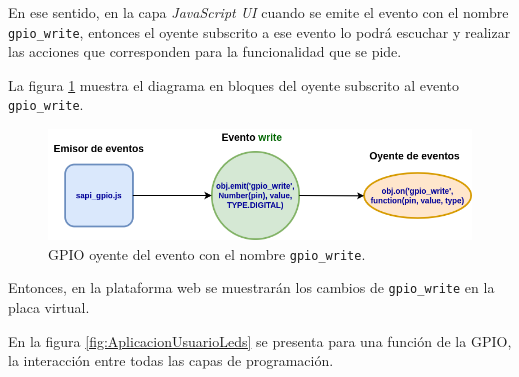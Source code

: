 En ese sentido, en la capa \textit{JavaScript UI}  cuando se emite el evento con el nombre \texttt{gpio\_write}, entonces el oyente subscrito a ese evento lo podrá escuchar y realizar las acciones que corresponden para la funcionalidad que se pide.

La figura \ref{fig:ListeningGPIOEventEmitter} muestra el diagrama en bloques del oyente subscrito al evento \texttt{gpio\_write}.

\hfill \break

\begin{figure}[ht]
	\centering
	\includegraphics[scale=.50]{./Figures/ListeningGPIOEventEmitter.png}
	\caption{GPIO oyente del evento con el nombre \texttt{gpio\_write}.}
	\label{fig:ListeningGPIOEventEmitter}
\end{figure}

Entonces, en la plataforma web se muestrarán los cambios de \texttt{gpio\_write} en la placa virtual. 

En la figura \ref{fig:AplicacionUsuarioLeds} se presenta para una función de la GPIO, la interacción entre todas las capas de programación.

\hfill \break
\hfill \break
\hfill \break
\hfill \break
\hfill \break
\hfill \break
\hfill \break
\hfill \break
\hfill \break

